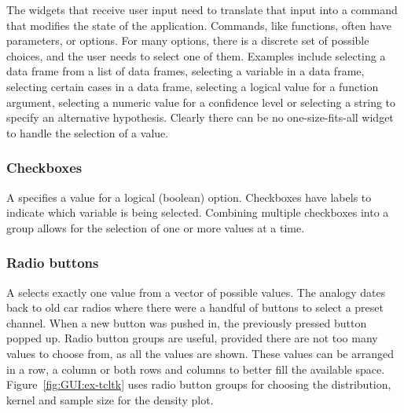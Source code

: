 The widgets that receive user input need to translate that input into
a command that modifies the state of the application. Commands, like
\R{} functions, often have parameters, or options. For many options,
there is a discrete set of possible choices, and the user needs to
select one of them. Examples include selecting a data frame from a list of data
frames, selecting a variable in a data frame, selecting certain cases
in a data frame, selecting a logical value for a function argument,
selecting a numeric value for a confidence level or selecting a string
to specify an alternative hypothesis. Clearly there can be no
one-size-fits-all widget to handle the selection of a value.



\subsubsection{Checkboxes}
\label{sec:GUI:checkboxes}

A  specifies a value for a logical
(boolean) option. Checkboxes have labels to indicate which variable is
being selected. Combining multiple checkboxes into a group allows for
the selection of one or more values at a time.


\subsubsection{Radio buttons}
\label{sec:GUI:radio=button-groups}

A  selects exactly one value from a vector of
possible values. The analogy dates back to old car radios where there
were a handful of buttons to select a preset channel. When a new
button was pushed in, the previously pressed button popped up.  Radio
button groups are useful, provided there are not too many values to
choose from, as all the values are shown. These values can be arranged
in a row, a column or both rows and columns to better fill the
available space. Figure~\ref{fig:GUI:ex-tcltk} uses radio button
groups for choosing the distribution, kernel and sample size for the
density plot.

